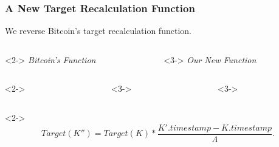 \begin{frame}
    \frametitle{A New Target Recalculation Function}

    We reverse Bitcoin's target recalculation function.
    \vspace*{1em}

    \begin{columns}[c, onlytextwidth]
        \begin{column}{0.45\textwidth}<2-> \centering
            \emph{Bitcoin's Function} \vspace*{1em}
        \end{column}
        \begin{column}{0.45\textwidth}<3-> \centering
            \emph{Our New Function} \vspace*{1em}
        \end{column}
    \end{columns}

    \begin{columns}[c, onlytextwidth]
        \begin{column}{0.45\textwidth}<2->
            
        \end{column}

        \begin{column}{0.1\textwidth}<3-> \centering
            \hspace*{.5em}
            \vspace*{.2em}
        \end{column}

        \begin{column}{0.45\textwidth}<3->
            
        \end{column}
    \end{columns}

    \begin{columns}[c, onlytextwidth]
        \footnotesize
        \begin{column}{0.45\textwidth}<2-> \centering
            \[ Target(K'') = Target(K) * \frac{K'.timestamp - K.timestamp}{\varLambda}. \]


\end{column}
\end{columns}
\end{frame}
